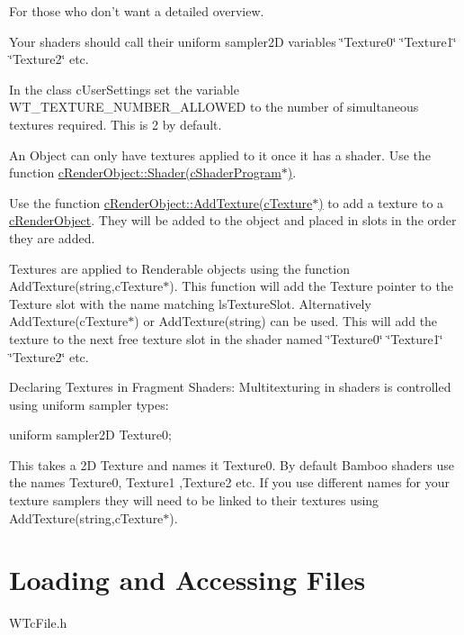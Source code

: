  For those who don't want a detailed overview.
\begin{DoxyItemize}
\item Your shaders should call their uniform sampler2D variables \char`\"{}Texture0\char`\"{} \char`\"{}Texture1\char`\"{} \char`\"{}Texture2\char`\"{} etc.
\item In the class cUserSettings set the variable WT\_\-TEXTURE\_\-NUMBER\_\-ALLOWED to the number of simultaneous textures required. This is 2 by default.
\item An Object can only have textures applied to it once it has a shader. Use the function \hyperlink{classc_render_object_abd47a58de22adfe1e9a1970f66a2f4cd}{cRenderObject::Shader(cShaderProgram$\ast$)}.
\item Use the function \hyperlink{classc_render_object_ad45b379f57731d803f7a52e58d91d3aa}{cRenderObject::AddTexture(cTexture$\ast$)} to add a texture to a \hyperlink{classc_render_object}{cRenderObject}. They will be added to the object and placed in slots in the order they are added. \par
 Textures are applied to Renderable objects using the function AddTexture(string,cTexture$\ast$). This function will add the Texture pointer to the Texture slot with the name matching lsTextureSlot. Alternatively AddTexture(cTexture$\ast$) or AddTexture(string) can be used. This will add the texture to the next free texture slot in the shader named \char`\"{}Texture0\char`\"{} \char`\"{}Texture1\char`\"{} \char`\"{}Texture2\char`\"{} etc. \par
 Declaring Textures in Fragment Shaders: Multitexturing in shaders is controlled using uniform sampler types: 
\begin{DoxyCode}
 uniform sampler2D Texture0;
\end{DoxyCode}
 This takes a 2D Texture and names it Texture0. By default Bamboo shaders use the names Texture0, Texture1 ,Texture2 etc. If you use different names for your texture samplers they will need to be linked to their textures using AddTexture(string,cTexture$\ast$). \par

\end{DoxyItemize}\hypertarget{_using_engine_page_FilesAccessPage}{}\section{Loading and Accessing Files}\label{_using_engine_page_FilesAccessPage}
WTcFile.h

